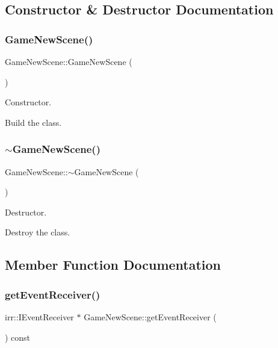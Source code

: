 \subsection{Constructor \& Destructor Documentation}
\mbox{\label{classGameNewScene_af482b13a2d9e315ef39a6e41293bf4fb}} 
\subsubsection{\texorpdfstring{Game\+New\+Scene()}{GameNewScene()}}
{\footnotesize\ttfamily Game\+New\+Scene\+::\+Game\+New\+Scene (\begin{DoxyParamCaption}{ }\end{DoxyParamCaption})}



Constructor. 

Build the class. \mbox{\label{classGameNewScene_a3df0ff81012d3f7dbd08c7367be22fdf}} 
\subsubsection{\texorpdfstring{$\sim$\+Game\+New\+Scene()}{~GameNewScene()}}
{\footnotesize\ttfamily Game\+New\+Scene\+::$\sim$\+Game\+New\+Scene (\begin{DoxyParamCaption}{ }\end{DoxyParamCaption})}



Destructor. 

Destroy the class. 

\subsection{Member Function Documentation}
\mbox{\label{classGameNewScene_a21c27ef3ea1923d975683e1bcdd134fa}} 
\subsubsection{\texorpdfstring{get\+Event\+Receiver()}{getEventReceiver()}}
{\footnotesize\ttfamily irr\+::\+I\+Event\+Receiver $\ast$ Game\+New\+Scene\+::get\+Event\+Receiver (\begin{DoxyParamCaption}{ }\end{DoxyParamCaption}) const\hspace{0.3cm}{\ttfamily [virtual]}}



